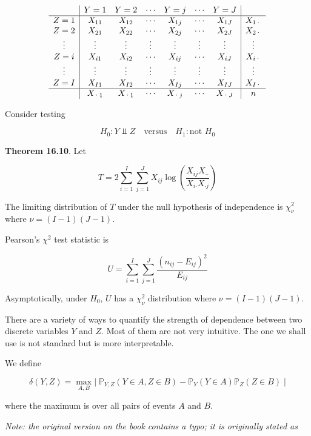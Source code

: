{    \[
\begin{array}{c|cccccc|c} 
       & Y = 1  & Y = 2  & \cdots & Y = j & \cdots & Y = J   & \\
\hline
Z = 1 & X_{11}  & X_{12} & \cdots & X_{1j} & \cdots & X_{1J} & X_{1\text{·}}\\
Z = 2 & X_{21}  & X_{22} & \cdots & X_{2j} & \cdots & X_{2J} & X_{2\text{·}}\\
\vdots & \vdots & \vdots & \vdots & \vdots & \vdots & \vdots & \vdots\\
Z = i & X_{i1}  & X_{i2} & \cdots & X_{ij} & \cdots & X_{iJ} & X_{i\text{·}}\\
\vdots & \vdots & \vdots & \vdots & \vdots & \vdots & \vdots & \vdots\\
Z = I & X_{I1}  & X_{I2} & \cdots & X_{Ij} & \cdots & X_{IJ} & X_{I\text{·}}\\
 \hline
      & X_{\text{·}1} & X_{\text{·}1} & \cdots & X_{\text{·}j} & \cdots & X_{\text{·}J} & n
\end{array}
\]

Consider testing

\[
H_0: Y \text{ ⫫ } Z
\quad \text{versus} \quad
H_1: \text{not } H_0
\]

\textbf{Theorem 16.10}. Let

\[ T = 2 \sum_{i=1}^I \sum_{j=1}^J X_{ij} \log \left( \frac{X_{ij} X_{\text{··}}}{X_{i\text{·}} X_{\text{·}j}} \right) \]

The limiting distribution of \(T\) under the null hypothesis of
independence is \(\chi^2_\nu\) where \(\nu = (I - 1)(J - 1)\).

Pearson's \(\chi^2\) test statistic is

\[ U = \sum_{i=1}^I \sum_{j=1}^J \frac{(n_{ij} - E_{ij})^2}{E_{ij}}\]

Asymptotically, under \(H_0\), \(U\) has a \(\chi^2_\nu\) distribution
where \(\nu = (I - 1)(J - 1)\).

There are a variety of ways to quantify the strength of dependence
between two discrete variables \(Y\) and \(Z\). Most of them are not
very intuitive. The one we shall use is not standard but is more
interpretable.

We define

\[\delta(Y, Z) = \max_{A, B} \Big|\; \mathbb{P}_{Y, Z}(Y \in A, Z \in B) - \mathbb{P}_Y(Y \in A)\mathbb{P}_Z(Z \in B) \;\Big|\]

where the maximum is over all pairs of events \(A\) and \(B\).

\emph{Note: the original version on the book contains a typo; it is
originally stated as}

}
